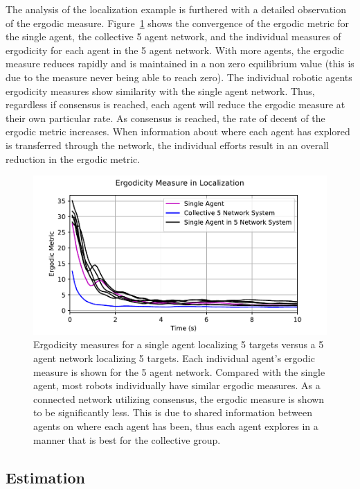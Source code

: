 \documentclass[letterpaper, 10 pt,  conference, twoside]{IEEEtran/IEEEtran}
\theoremstyle{definition}
\begin{document}
The analysis of the localization example is furthered with a detailed observation of the ergodic measure. Figure~\ref{fig:disloc_conv} shows the convergence of the ergodic metric for the single agent, the collective 5 agent network, and the individual measures of ergodicity for each agent in the 5 agent network. With more agents, the ergodic measure reduces rapidly and is maintained in a non zero equilibrium value (this is due to the measure never being able to reach zero). The individual robotic agents ergodicity measures show similarity with the single agent network. Thus, regardless if consensus is reached, each agent will reduce the ergodic measure at their own particular rate. As consensus is reached, the rate of decent of the ergodic metric increases. When information about where each agent has explored is transferred through the network, the individual efforts result in an overall reduction in the ergodic metric.

\begin{figure}[!h]
\centering
\includegraphics[scale=0.5]{figures/localization_convergence.pdf}
\caption{ Ergodicity measures for a single agent localizing 5 targets versus a 5 agent network localizing 5 targets. Each individual agent's ergodic measure is shown for the 5 agent network. Compared with the single agent, most robots individually have similar ergodic measures. As a connected network utilizing consensus, the ergodic measure is shown to be significantly less. This is due to shared information between agents on where each agent has been, thus each agent explores in a manner that is best for the collective group. }
\label{fig:disloc_conv}
\end{figure}

\subsection{Estimation}
\end{document}
